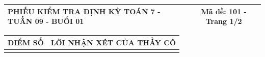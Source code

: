 \documentclass[12pt,a4paper]{article}
\begin{document}
\pagestyle{empty}
\noindent
\begin{tabularx}{\linewidth}{|X|c|}
\hline
\textbf{PHIẾU KIỂM TRA ĐỊNH KỲ TOÁN 7 - TUẦN 09 - BUỔI 01} & \textbf{Mã đề: 101 - Trang 1/2} \\
\hline
\end{tabularx}

\vspace{1.2mm}

\noindent
\begin{tabularx}{\linewidth}{|p{3.2cm}|X|}
\hline
\centering\textbf{ĐIỂM SỐ} & \centering\textbf{LỜI NHẬN XÉT CỦA THẦY CÔ} \tabularnewline
\hline
\rule{0pt}{1.8cm} & \tabularnewline
\hline
\end{tabularx}
\end{document}
